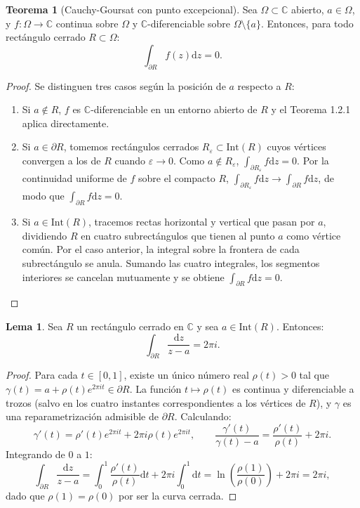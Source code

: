 \documentclass[11pt,a4paper]{article}
\theoremstyle{definition}
\newtheorem{teorema}{Teorema}[section]
\newtheorem{lema}{Lema}[section]
\theoremstyle{remark}
\numberwithin{equation}{section}
\newcommand{\dz}{\mathrm{d}z}
\newcommand{\dt}{\mathrm{d}t}
\begin{document}
\begin{teorema}[Cauchy-Goursat con punto excepcional]
Sea $\Omega \subset \mathbb{C}$ abierto, $a \in \Omega$, y $f: \Omega \to \mathbb{C}$ continua sobre $\Omega$ y $\mathbb{C}$-diferenciable sobre $\Omega \setminus \{a\}$. Entonces, para todo rectángulo cerrado $R \subset \Omega$:
\begin{equation}
\int_{\partial R} f(z) \dz = 0.
\end{equation}
\end{teorema}
\begin{proof}
Se distinguen tres casos según la posición de $a$ respecto a $R$:
\begin{enumerate}
\item Si $a \notin R$, $f$ es $\mathbb{C}$-diferenciable en un entorno abierto de $R$ y el Teorema 1.2.1 aplica directamente.
\item Si $a \in \partial R$, tomemos rectángulos cerrados $R_\varepsilon \subset \mathrm{Int}(R)$ cuyos vértices convergen a los de $R$ cuando $\varepsilon \to 0$. Como $a \notin R_\varepsilon$, $\int_{\partial R_\varepsilon} f \dz = 0$. Por la continuidad uniforme de $f$ sobre el compacto $R$, $\int_{\partial R_\varepsilon} f \dz \to \int_{\partial R} f \dz$, de modo que $\int_{\partial R} f \dz = 0$.
\item Si $a \in \mathrm{Int}(R)$, tracemos rectas horizontal y vertical que pasan por $a$, dividiendo $R$ en cuatro subrectángulos que tienen al punto $a$ como vértice común. Por el caso anterior, la integral sobre la frontera de cada subrectángulo se anula. Sumando las cuatro integrales, los segmentos interiores se cancelan mutuamente y se obtiene $\int_{\partial R} f \dz = 0$.
\end{enumerate}
\end{proof}

\begin{lema}
Sea $R$ un rectángulo cerrado en $\mathbb{C}$ y sea $a \in \mathrm{Int}(R)$. Entonces:
\begin{equation}
\int_{\partial R} \frac{\dz}{z-a} = 2\pi i.
\end{equation}
\end{lema}
\begin{proof}
Para cada $t \in [0,1]$, existe un único número real $\rho(t) > 0$ tal que $\gamma(t) = a + \rho(t)e^{2\pi i t} \in \partial R$. La función $t \mapsto \rho(t)$ es continua y diferenciable a trozos (salvo en los cuatro instantes correspondientes a los vértices de $R$), y $\gamma$ es una reparametrización admisible de $\partial R$. Calculando:
\[
\gamma'(t) = \rho'(t)e^{2\pi i t} + 2\pi i \rho(t)e^{2\pi i t}, \qquad \frac{\gamma'(t)}{\gamma(t)-a} = \frac{\rho'(t)}{\rho(t)} + 2\pi i.
\]
Integrando de $0$ a $1$:
\[
\int_{\partial R} \frac{\dz}{z-a} = \int_0^1 \frac{\rho'(t)}{\rho(t)}\dt + 2\pi i \int_0^1 \dt = \ln\left(\frac{\rho(1)}{\rho(0)}\right) + 2\pi i = 2\pi i,
\]
dado que $\rho(1) = \rho(0)$ por ser la curva cerrada.
\end{proof}
\end{document}
